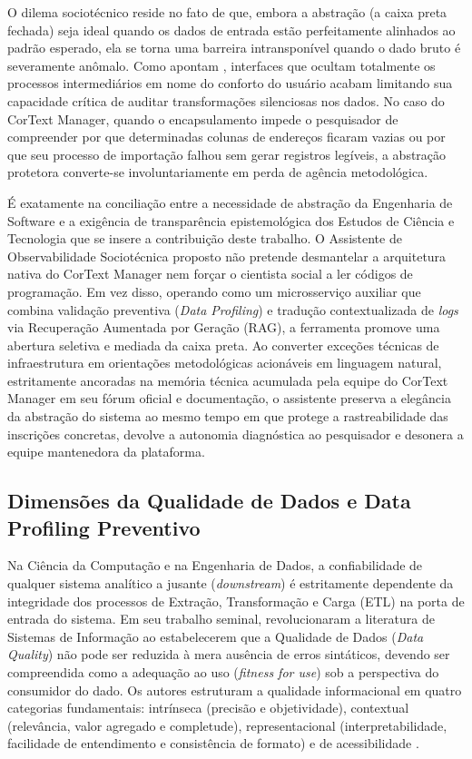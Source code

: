 \documentclass[
	oneside,
	a4paper,
	12pt,
	chapter=TITLE,
	section=TITLE,
	english,
	brazilian
]{abntex2}
\begin{document}
O dilema sociotécnico reside no fato de que, embora a abstração (a caixa preta fechada) seja ideal quando os dados de entrada estão perfeitamente alinhados ao padrão esperado, ela se torna uma barreira intransponível quando o dado bruto é severamente anômalo. Como apontam , interfaces que ocultam totalmente os processos intermediários em nome do conforto do usuário acabam limitando sua capacidade crítica de auditar transformações silenciosas nos dados. No caso do CorText Manager, quando o encapsulamento impede o pesquisador de compreender por que determinadas colunas de endereços ficaram vazias ou por que seu processo de importação falhou sem gerar registros legíveis, a abstração protetora converte-se involuntariamente em perda de agência metodológica.

É exatamente na conciliação entre a necessidade de abstração da Engenharia de Software e a exigência de transparência epistemológica dos Estudos de Ciência e Tecnologia que se insere a contribuição deste trabalho. O Assistente de Observabilidade Sociotécnica proposto não pretende desmantelar a arquitetura nativa do CorText Manager nem forçar o cientista social a ler códigos de programação. Em vez disso, operando como um microsserviço auxiliar que combina validação preventiva (\textit{Data Profiling}) e tradução contextualizada de \textit{logs} via Recuperação Aumentada por Geração (RAG), a ferramenta promove uma abertura seletiva e mediada da caixa preta. Ao converter exceções técnicas de infraestrutura em orientações metodológicas acionáveis em linguagem natural, estritamente ancoradas na memória técnica acumulada pela equipe do CorText Manager em seu fórum oficial e documentação, o assistente preserva a elegância da abstração do sistema ao mesmo tempo em que protege a rastreabilidade das inscrições concretas, devolve a autonomia diagnóstica ao pesquisador e desonera a equipe mantenedora da plataforma.

\FloatBarrier
\subsection{Dimensões da Qualidade de Dados e Data Profiling Preventivo}\label{sec:dimensoes_da_qualidade_de_dados_e_data_p}


Na Ciência da Computação e na Engenharia de Dados, a confiabilidade de qualquer sistema analítico a jusante (\textit{downstream}) é estritamente dependente da integridade dos processos de Extração, Transformação e Carga (ETL) na porta de entrada do sistema. Em seu trabalho seminal,  revolucionaram a literatura de Sistemas de Informação ao estabelecerem que a Qualidade de Dados (\textit{Data Quality}) não pode ser reduzida à mera ausência de erros sintáticos, devendo ser compreendida como a adequação ao uso (\textit{fitness for use}) sob a perspectiva do consumidor do dado. Os autores estruturam a qualidade informacional em quatro categorias fundamentais: intrínseca (precisão e objetividade), contextual (relevância, valor agregado e completude), representacional (interpretabilidade, facilidade de entendimento e consistência de formato) e de acessibilidade \cite{Wang1996}.
\end{document}
